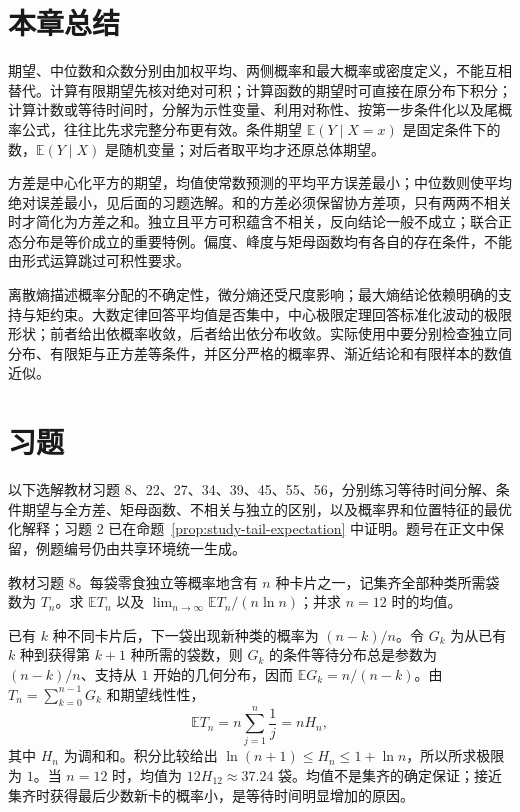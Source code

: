 \section*{本章总结}

期望、中位数和众数分别由加权平均、两侧概率和最大概率或密度定义，不能互相替代。计算有限期望先核对绝对可积；计算函数的期望时可直接在原分布下积分；计算计数或等待时间时，分解为示性变量、利用对称性、按第一步条件化以及尾概率公式，往往比先求完整分布更有效。条件期望 $\mathbb E(Y\mid X=x)$ 是固定条件下的数，$\mathbb E(Y\mid X)$ 是随机变量；对后者取平均才还原总体期望。

方差是中心化平方的期望，均值使常数预测的平均平方误差最小；中位数则使平均绝对误差最小，见后面的习题选解。和的方差必须保留协方差项，只有两两不相关时才简化为方差之和。独立且平方可积蕴含不相关，反向结论一般不成立；联合正态分布是等价成立的重要特例。偏度、峰度与矩母函数均有各自的存在条件，不能由形式运算跳过可积性要求。

离散熵描述概率分配的不确定性，微分熵还受尺度影响；最大熵结论依赖明确的支持与矩约束。大数定律回答平均值是否集中，中心极限定理回答标准化波动的极限形状；前者给出依概率收敛，后者给出依分布收敛。实际使用中要分别检查独立同分布、有限矩与正方差等条件，并区分严格的概率界、渐近结论和有限样本的数值近似。

\section*{习题}

以下选解教材习题 8、22、27、34、39、45、55、56，分别练习等待时间分解、条件期望与全方差、矩母函数、不相关与独立的区别，以及概率界和位置特征的最优化解释；习题 2 已在命题~\ref{prop:study-tail-expectation} 中证明。题号在正文中保留，例题编号仍由共享环境统一生成。

\begin{example}
\label{ex:study-exercise4-8}
教材习题 8。每袋零食独立等概率地含有 $n$ 种卡片之一，记集齐全部种类所需袋数为 $T_n$。求 $\mathbb E T_n$ 以及 $\lim_{n\to\infty}\mathbb E T_n/(n\ln n)$；并求 $n=12$ 时的均值。
\end{example}

\begin{solve}
已有 $k$ 种不同卡片后，下一袋出现新种类的概率为 $(n-k)/n$。令 $G_k$ 为从已有 $k$ 种到获得第 $k+1$ 种所需的袋数，则 $G_k$ 的条件等待分布总是参数为 $(n-k)/n$、支持从 $1$ 开始的几何分布，因而 $\mathbb E G_k=n/(n-k)$。由 $T_n=\sum_{k=0}^{n-1}G_k$ 和期望线性性，
\[
  \mathbb E T_n=n\sum_{j=1}^n\frac1j=nH_n,
\]
其中 $H_n$ 为调和和。积分比较给出 $\ln(n+1)\le H_n\le1+\ln n$，所以所求极限为 $1$。当 $n=12$ 时，均值为 $12H_{12}\approx37.24$ 袋。均值不是集齐的确定保证；接近集齐时获得最后少数新卡的概率小，是等待时间明显增加的原因。
\end{solve}

